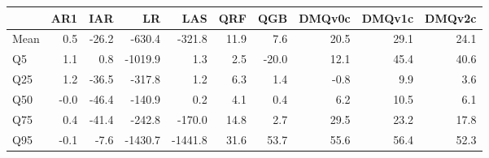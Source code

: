 \begin{tabular}{lrrrrrrrrr}
\toprule
 & AR1 & IAR & LR & LAS & QRF & QGB & DMQv0c & DMQv1c & DMQv2c \\
\midrule
Mean & 0.5 & -26.2 & -630.4 & -321.8 & 11.9 & 7.6 & 20.5 & 29.1 & 24.1 \\
Q5 & 1.1 & 0.8 & -1019.9 & 1.3 & 2.5 & -20.0 & 12.1 & 45.4 & 40.6 \\
Q25 & 1.2 & -36.5 & -317.8 & 1.2 & 6.3 & 1.4 & -0.8 & 9.9 & 3.6 \\
Q50 & -0.0 & -46.4 & -140.9 & 0.2 & 4.1 & 0.4 & 6.2 & 10.5 & 6.1 \\
Q75 & 0.4 & -41.4 & -242.8 & -170.0 & 14.8 & 2.7 & 29.5 & 23.2 & 17.8 \\
Q95 & -0.1 & -7.6 & -1430.7 & -1441.8 & 31.6 & 53.7 & 55.6 & 56.4 & 52.3 \\
\bottomrule
\end{tabular}
